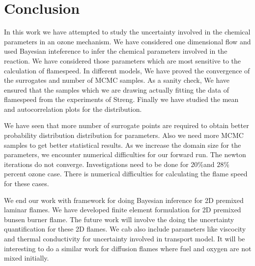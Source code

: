 \chapter{Conclusion}

\noindent In this work we have attempted to study the uncertainty involved in the chemical parameters in an ozone mechanism. We have considered one dimensional flow and used Bayesian inteference to infer the chemical parameters involved in the reaction. We have considered those parameters which are most sensitive to the calculation of flamespeed. In different models, We have proved the convergence of the surrogates and  number of MCMC samples. As a sanity check, We have ensured that the samples which we are drawing actually fitting the data of flamespeed from the experiments of Streng\cite{Streng}. Finally we have studied the mean and autocorrelation plots for the distribution. 


\noindent We have seen that more number of surrogate points are required to obtain better probability distribution distribution for parameters. Also we need more MCMC samples to get better statistical results. As we increase the domain size for the parameters, we encounter numerical difficulties for our forward run. The newton iterations do not converge. Investigations need to be done for $20 \% $and $ 28 \% $ percent ozone case. There is numerical difficulties for calculating the flame speed for these cases.  

\noindent We end our work with  framework for doing Bayesian inference for 2D premixed laminar flames. We have developed finite element formulation for 2D premixed bunsen burner flame. The future work will involve the doing the uncertainty quantification for these 2D flames. We cab also include parameters like viscocity and  thermal conductivity for uncertainty involved in transport model. It will be interesting to do a similar work for diffusion flames where fuel and oxygen are not mixed initially. 

\noindent 